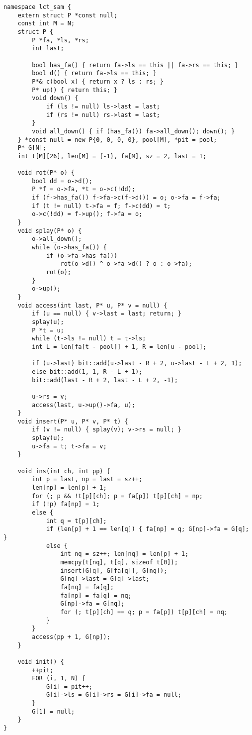 \documentclass[]{article}
\begin{document}
\begin{verbatim}
namespace lct_sam {
    extern struct P *const null;
    const int M = N;
    struct P {
        P *fa, *ls, *rs;
        int last;

        bool has_fa() { return fa->ls == this || fa->rs == this; }
        bool d() { return fa->ls == this; }
        P*& c(bool x) { return x ? ls : rs; }
        P* up() { return this; }
        void down() {
            if (ls != null) ls->last = last;
            if (rs != null) rs->last = last;
        }
        void all_down() { if (has_fa()) fa->all_down(); down(); }
    } *const null = new P{0, 0, 0, 0}, pool[M], *pit = pool;
    P* G[N];
    int t[M][26], len[M] = {-1}, fa[M], sz = 2, last = 1;

    void rot(P* o) {
        bool dd = o->d();
        P *f = o->fa, *t = o->c(!dd);
        if (f->has_fa()) f->fa->c(f->d()) = o; o->fa = f->fa;
        if (t != null) t->fa = f; f->c(dd) = t;
        o->c(!dd) = f->up(); f->fa = o;
    }
    void splay(P* o) {
        o->all_down();
        while (o->has_fa()) {
            if (o->fa->has_fa())
                rot(o->d() ^ o->fa->d() ? o : o->fa);
            rot(o);
        }
        o->up();
    }
    void access(int last, P* u, P* v = null) {
        if (u == null) { v->last = last; return; }
        splay(u);
        P *t = u;
        while (t->ls != null) t = t->ls;
        int L = len[fa[t - pool]] + 1, R = len[u - pool];
        
        if (u->last) bit::add(u->last - R + 2, u->last - L + 2, 1);
        else bit::add(1, 1, R - L + 1);
        bit::add(last - R + 2, last - L + 2, -1);
        
        u->rs = v;
        access(last, u->up()->fa, u);
    }
    void insert(P* u, P* v, P* t) {
        if (v != null) { splay(v); v->rs = null; }
        splay(u);
        u->fa = t; t->fa = v;
    }

    void ins(int ch, int pp) {
        int p = last, np = last = sz++;
        len[np] = len[p] + 1;
        for (; p && !t[p][ch]; p = fa[p]) t[p][ch] = np;
        if (!p) fa[np] = 1;
        else {
            int q = t[p][ch];
            if (len[p] + 1 == len[q]) { fa[np] = q; G[np]->fa = G[q]; }
            else {
                int nq = sz++; len[nq] = len[p] + 1;
                memcpy(t[nq], t[q], sizeof t[0]);
                insert(G[q], G[fa[q]], G[nq]);
                G[nq]->last = G[q]->last;
                fa[nq] = fa[q];
                fa[np] = fa[q] = nq;
                G[np]->fa = G[nq];
                for (; t[p][ch] == q; p = fa[p]) t[p][ch] = nq;
            }
        }
        access(pp + 1, G[np]);
    }

    void init() {
        ++pit;
        FOR (i, 1, N) {
            G[i] = pit++;
            G[i]->ls = G[i]->rs = G[i]->fa = null;
        }
        G[1] = null;
    }
}
\end{verbatim}
\end{document}
